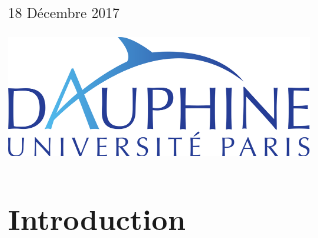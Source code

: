 \begin{titlepage}

	
	
	\vfill\vfill %
	
	{\large18 Décembre 2017} %

	



	\leavevmode \newline 	\leavevmode \newline 	\leavevmode \newline 	\leavevmode \newline 	\leavevmode \newline 
	\includegraphics[width=0.6\textwidth]{dauphine.png}\\[1cm] %


	 
	

	
\end{titlepage}





\section{Introduction}


